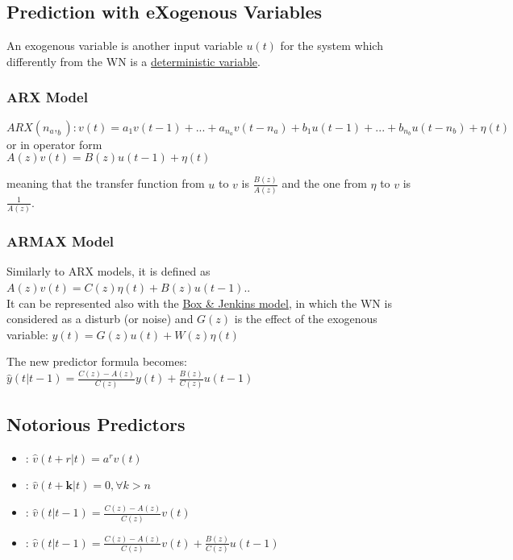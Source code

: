 \documentclass[10pt,a4paper]{article}
\begin{document}
\subsection{Prediction with eXogenous Variables}
An exogenous variable is another input variable $u(t)$ for the system which differently from the WN is a \uline{deterministic variable}.
\subsubsection{ARX Model}
\center $ARX(n_a,_b): v(t)=a_1v(t-1)+...+a_{n_a}v(t-n_a)+b_1u(t-1)+...+b_{n_b}u(t-n_b)+\eta(t)$ 
\\ \vspace{0.3em}
or in operator form
\\ \vspace{0.3em}
$A(z)v(t)=B(z)u(t-1)+\eta(t)$
\\ \raggedright \vspace{0.5em}
meaning that the transfer function from $u$ to $v$ is $\frac{B(z)}{A(z)}$ and the one from $\eta$ to $v$ is $\frac{1}{A(z)}$.
\subsubsection{ARMAX Model}
Similarly to ARX models, it is defined as $A(z)v(t)=C(z)\eta(t)+B(z)u(t-1).$. \\
It can be represented also with the \uline{Box \& Jenkins model}, in which the WN is considered as a disturb (or noise) and $G(z)$ is the effect of the exogenous variable: 
\center 
$y(t)=G(z)u(t)+W(z)\eta(t)$
\\ \raggedright \vspace{0.5em}
The new predictor formula becomes:
\center 
$\hat{y}(t|t-1)=\frac{C(z)-A(z)}{C(z)}y(t)+\frac{B(z)}{C(z)}u(t-1)$
\\ \raggedright
\subsection{Notorious Predictors}
\begin{itemize}
	\item {}: $\hat{v}(t+r|t)=a^rv(t)$  
	\item {}: $\hat{v}(t+\bm{k}|t)=0, \forall k > n$ 
	\item {}: $\hat{v}(t|t-1)=\frac{C(z)-A(z)}{C(z)}v(t)$
	\item {}: $\hat{v}(t|t-1)=\frac{C(z)-A(z)}{C(z)}v(t) + \frac{B(z)}{C(z)}u(t-1)$
\end{itemize}
\end{document}
